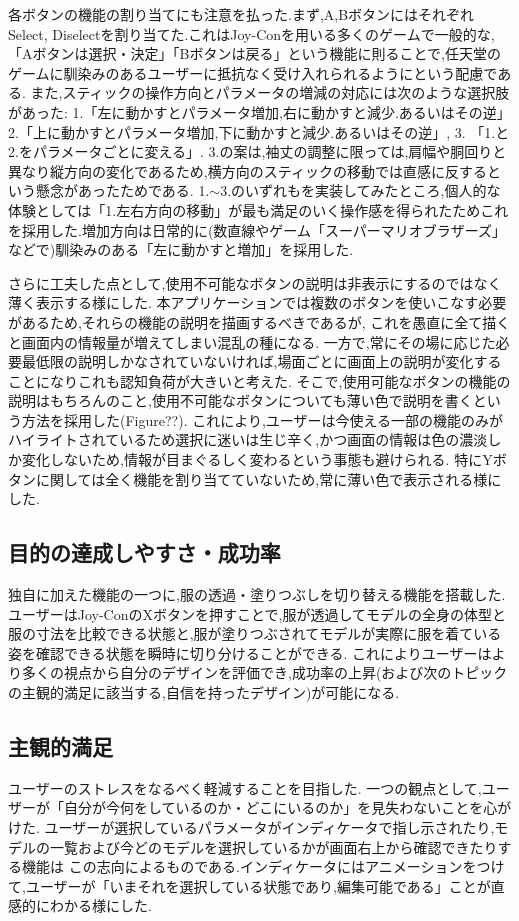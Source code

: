 \documentclass[dvipdfmx]{jsarticle}
\newcommand{\1}{\mbox{1}\hspace{-0.25em}\mbox{l}}
\begin{document}
各ボタンの機能の割り当てにも注意を払った.まず,A,BボタンにはそれぞれSelect, Diselectを割り当てた.これはJoy-Conを用いる多くのゲームで一般的な,「Aボタンは選択・決定」「Bボタンは戻る」という機能に則ることで,任天堂のゲームに馴染みのあるユーザーに抵抗なく受け入れられるようにという配慮である.
また,スティックの操作方向とパラメータの増減の対応には次のような選択肢があった: 1.「左に動かすとパラメータ増加,右に動かすと減少.あるいはその逆」2.「上に動かすとパラメータ増加,下に動かすと減少.あるいはその逆」, 3. 「1.と2.をパラメータごとに変える」.
3.の案は,袖丈の調整に限っては,肩幅や胴回りと異なり縦方向の変化であるため,横方向のスティックの移動では直感に反するという懸念があったためである.
1.$\sim$3.のいずれもを実装してみたところ,個人的な体験としては「1.左右方向の移動」が最も満足のいく操作感を得られたためこれを採用した.増加方向は日常的に(数直線やゲーム「スーパーマリオブラザーズ」などで)馴染みのある「左に動かすと増加」を採用した.

さらに工夫した点として,使用不可能なボタンの説明は非表示にするのではなく薄く表示する様にした.
本アプリケーションでは複数のボタンを使いこなす必要があるため,それらの機能の説明を描画するべきであるが, これを愚直に全て描くと画面内の情報量が増えてしまい混乱の種になる.
一方で,常にその場に応じた必要最低限の説明しかなされていないければ,場面ごとに画面上の説明が変化することになりこれも認知負荷が大きいと考えた.
そこで,使用可能なボタンの機能の説明はもちろんのこと,使用不可能なボタンについても薄い色で説明を書くという方法を採用した(Figure??).
これにより,ユーザーは今使える一部の機能のみがハイライトされているため選択に迷いは生じ辛く,かつ画面の情報は色の濃淡しか変化しないため,情報が目まぐるしく変わるという事態も避けられる.
特にYボタンに関しては全く機能を割り当てていないため,常に薄い色で表示される様にした.


\subsection*{目的の達成しやすさ・成功率}
独自に加えた機能の一つに,服の透過・塗りつぶしを切り替える機能を搭載した.
ユーザーはJoy-ConのXボタンを押すことで,服が透過してモデルの全身の体型と服の寸法を比較できる状態と,服が塗りつぶされてモデルが実際に服を着ている姿を確認できる状態を瞬時に切り分けることができる.
これによりユーザーはより多くの視点から自分のデザインを評価でき,成功率の上昇(および次のトピックの主観的満足に該当する,自信を持ったデザイン)が可能になる. \\




\subsection*{主観的満足}
ユーザーのストレスをなるべく軽減することを目指した.
一つの観点として,ユーザーが「自分が今何をしているのか・どこにいるのか」を見失わないことを心がけた.
ユーザーが選択しているパラメータがインディケータで指し示されたり,モデルの一覧および今どのモデルを選択しているかが画面右上から確認できたりする機能は
この志向によるものである.インディケータにはアニメーションをつけて,ユーザーが「いまそれを選択している状態であり,編集可能である」ことが直感的にわかる様にした.
\end{document}
